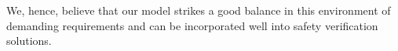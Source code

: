 \documentclass[acmsmall,nonacm]{acmart}
\begin{document}
We, hence, believe that our model strikes a good balance in this environment of demanding requirements and can be incorporated well into safety verification solutions. %

\pagebreak  




\end{document}

